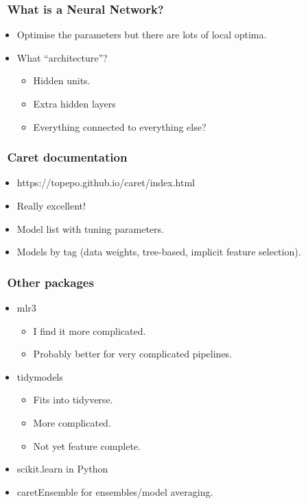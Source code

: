 \documentclass[handout, aspectratio = 169]{beamer}
\begin{document}
\begin{frame}
\frametitle{\insertframenumber~What is a Neural Network?}

\begin{itemize}
\item Optimise the parameters but there are lots of local optima.
\item What ``architecture''?
	\begin{itemize}
	\item Hidden units.
	\item Extra hidden layers
	\item Everything connected to everything else?
	\end{itemize}
\end{itemize}
\end{frame} 


\begin{frame}
\frametitle{\insertframenumber~Caret documentation}

\begin{itemize}
\item https://topepo.github.io/caret/index.html
\item Really excellent!
\item Model list with tuning parameters.
\item Models by tag (data weights, tree-based, implicit feature selection).
\end{itemize}
\end{frame} 


\begin{frame}
\frametitle{\insertframenumber~Other packages}

\begin{itemize}
\item mlr3
	\begin{itemize}
	\item I find it more complicated. 
	\item Probably better for very complicated pipelines.
	\end{itemize}
\item tidymodels
	\begin{itemize}
	\item Fits into tidyverse.
	\item More complicated.
	\item Not yet feature complete.
	\end{itemize}
\item scikit.learn in Python
\item caretEnsemble for ensembles/model averaging.
\end{itemize}
\end{frame} 
\end{document}
